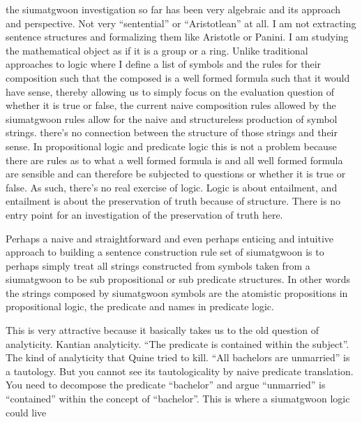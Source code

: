 






the siumatgwoon investigation so far has been very algebraic and its approach and perspective. Not very “sentential” or “Aristotlean” at all. I am not extracting sentence structures and formalizing them like Aristotle or Panini. I am studying the mathematical object as if it is a group or a ring. Unlike traditional approaches to logic where I define a list of symbols and the rules for their composition such that the composed is a well formed formula such that it would have sense, thereby allowing us to simply focus on the evaluation question of whether it is true or false, the current naive composition rules allowed by the siumatgwoon rules allow for the naive and structureless production of symbol strings. there’s no connection between the structure of those strings and their sense. In propositional logic and predicate logic this is not a problem because there are rules as to what a well formed formula is and all well formed formula are sensible and can therefore be subjected to questions or whether it is true or false.  As such, there’s no real exercise of logic. Logic is about entailment, and entailment is about the preservation of truth because of structure. There is no entry point for an investigation of the preservation of truth here. 

Perhaps a naive and straightforward and even perhaps enticing and intuitive approach to building a sentence construction rule set of siumatgwoon is to perhaps simply treat all strings constructed from symbols taken from a siumatgwoon to be sub propositional or sub predicate structures. In other words the strings composed by siumatgwoon symbols are the atomistic propositions in propositional logic, the predicate and names in predicate logic. 

This is very attractive because it basically takes us to the old question of analyticity. Kantian analyticity. “The predicate is contained within the subject”. The kind of analyticity that Quine tried to kill. “All bachelors are unmarried” is a tautology. But you cannot see its tautologicality by naive predicate translation. You need to decompose the predicate “bachelor” and argue “unmarried” is “contained” within the concept of “bachelor”. This is where a siumatgwoon logic could live

